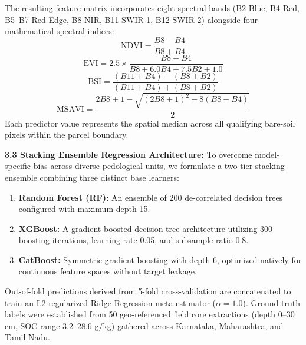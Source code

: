 \documentclass[11pt,a4paper]{article}
\begin{document}
The resulting feature matrix incorporates eight spectral bands (B2 Blue, B4 Red, B5--B7 Red-Edge, B8 NIR, B11 SWIR-1, B12 SWIR-2) alongside four mathematical spectral indices:
\begin{equation}
    \text{NDVI} = \frac{B8 - B4}{B8 + B4}
\end{equation}
\begin{equation}
    \text{EVI} = 2.5 \times \frac{B8 - B4}{B8 + 6.0B4 - 7.5B2 + 1.0}
\end{equation}
\begin{equation}
    \text{BSI} = \frac{(B11 + B4) - (B8 + B2)}{(B11 + B4) + (B8 + B2)}
\end{equation}
\begin{equation}
    \text{MSAVI} = \frac{2B8 + 1 - \sqrt{(2B8 + 1)^2 - 8(B8 - B4)}}{2}
\end{equation}
Each predictor value represents the spatial median across all qualifying bare-soil pixels within the parcel boundary.

\noindent \textbf{3.3 Stacking Ensemble Regression Architecture:} 
To overcome model-specific bias across diverse pedological units, we formulate a two-tier stacking ensemble combining three distinct base learners:
\begin{enumerate}[noitemsep,topsep=2pt]
    \item \textbf{Random Forest (RF):} An ensemble of 200 de-correlated decision trees configured with maximum depth 15.
    \item \textbf{XGBoost:} A gradient-boosted decision tree architecture utilizing 300 boosting iterations, learning rate 0.05, and subsample ratio 0.8.
    \item \textbf{CatBoost:} Symmetric gradient boosting with depth 6, optimized natively for continuous feature spaces without target leakage.
\end{enumerate}
Out-of-fold predictions derived from 5-fold cross-validation are concatenated to train an L2-regularized Ridge Regression meta-estimator ($\alpha = 1.0$). Ground-truth labels were established from 50 geo-referenced field core extractions (depth 0--30 cm, SOC range 3.2--28.6 g/kg) gathered across Karnataka, Maharashtra, and Tamil Nadu.
\end{document}
